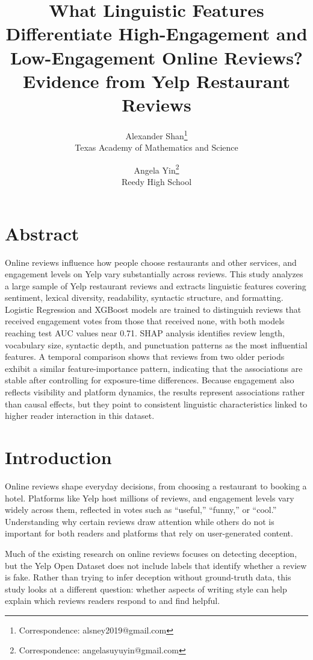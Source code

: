 \documentclass[12pt]{article}
\title{What Linguistic Features Differentiate High-Engagement and Low-Engagement Online Reviews? Evidence from Yelp Restaurant Reviews}
\author{
Alexander Shan\thanks{Correspondence: alsney2019@gmail.com}\\
Texas Academy of Mathematics and Science
\and
Angela Yin\thanks{Correspondence: angelasuyuyin@gmail.com}\\
Reedy High School
}
\begin{document}
\maketitle

\fontsize{12pt}{12pt}\selectfont

\section*{Abstract}

Online reviews influence how people choose restaurants and other services, and engagement levels on Yelp vary substantially across reviews. 
This study analyzes a large sample of Yelp restaurant reviews and extracts linguistic features covering sentiment, lexical diversity, readability, syntactic structure, 
and formatting. Logistic Regression and XGBoost models are trained to distinguish reviews that received engagement votes from those that received none, 
with both models reaching test AUC values near 0.71. SHAP analysis identifies review length, vocabulary size, syntactic depth, and punctuation patterns as the most influential features. A temporal comparison shows that reviews from two older periods exhibit a similar feature-importance pattern, indicating that the associations are stable after controlling for exposure-time differences. Because engagement also reflects visibility and platform dynamics, the results represent associations rather than causal effects, but they point to consistent linguistic characteristics linked to higher reader interaction in this dataset.

\section{Introduction}

Online reviews shape everyday decisions, from choosing a restaurant to booking a hotel. Platforms like Yelp host millions of reviews, and engagement levels vary widely across them, reflected in votes such as “useful,” “funny,” or “cool.” Understanding why certain reviews draw attention while others do not is important for both readers and platforms that rely on user-generated content.

Much of the existing research on online reviews focuses on detecting deception, but the Yelp Open Dataset does not include labels that identify whether a review is fake. Rather than trying to infer deception without ground-truth data, this study looks at a different question: whether aspects of writing style can help explain which reviews readers respond to and find helpful.
\end{document}
